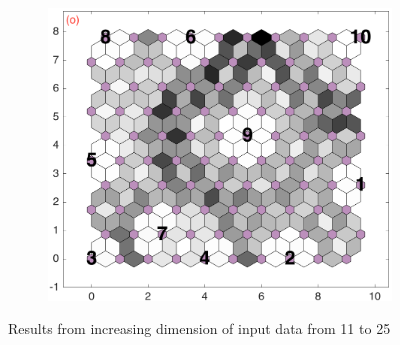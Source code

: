\begin{figure}
\begin{subfigure}[b]{0.25\textwidth}
        \label{fig: col3and24_dist}
    \end{subfigure}
            \hfill
    \begin{subfigure}[b]{0.25\textwidth}
        \centering
        \includegraphics[width=\textwidth]{../../images0.01/M31/2D/diff_dimension/combine_2D_data_between_cols3and25.png}
        \label{fig: col3and25_dist}
    \end{subfigure}
    \caption{Results from increasing dimension of input data from 11 to 25}
    \label{fig: inc_D_col3s}
\end{figure}